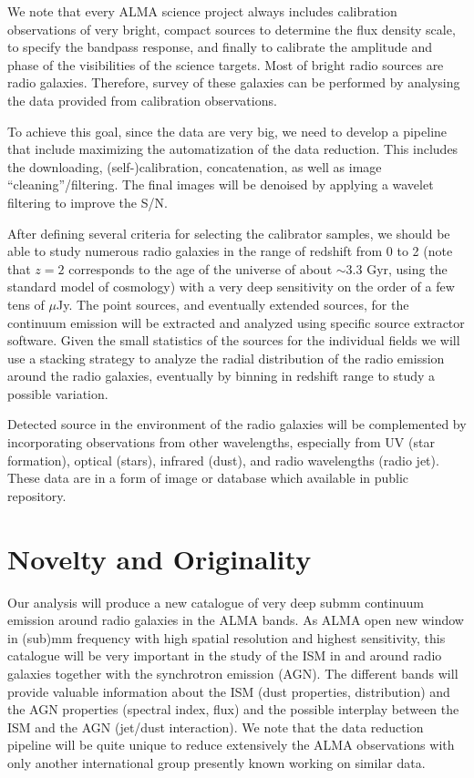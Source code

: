 We note that every ALMA science project always includes calibration observations of very bright, compact sources to determine the flux density scale, to specify the bandpass response, and finally to calibrate the amplitude and phase of the visibilities  of the science targets. Most of bright radio sources are radio galaxies. Therefore, survey of these galaxies can be performed by analysing the data provided from calibration observations.

To achieve this goal, since the data are very big, we need to develop a pipeline that include maximizing the automatization of the data reduction. This includes the downloading, (self-)calibration, concatenation, as well as image ``cleaning''/filtering.  The final images will be denoised by applying a wavelet filtering 
\citep[e.g.,][]{leon2000} to improve the S/N.

After defining several criteria for selecting the calibrator samples, we should be able to study numerous radio galaxies in the range of  redshift from 0 to 2 (note that $z = 2$ corresponds to the age of the universe of about $\sim 3.3$ Gyr, using the standard model of cosmology) with a very deep sensitivity on the order of a few tens of $\mu$Jy. The point sources, and eventually extended sources, for the continuum emission will be extracted and analyzed using specific source extractor software.  Given the small statistics of the sources for the individual fields we will use a stacking strategy to analyze the radial distribution of the radio emission around the radio galaxies, eventually by binning in redshift range to study a possible variation.

Detected source in the environment of the radio galaxies  will be complemented by incorporating observations from other wavelengths, especially from  UV (star formation), optical (stars), infrared (dust), and radio wavelengths (radio jet). These data are in a form of image or database which available in public repository. 

\section{Novelty and Originality}

Our analysis will produce a new catalogue of very deep submm continuum emission around radio galaxies in the ALMA bands. As ALMA open new window in (sub)mm frequency with high spatial resolution and highest sensitivity, this catalogue will be very important in the study of the ISM in  and around radio galaxies together with the synchrotron emission (AGN). The different bands will provide valuable information about the ISM (dust properties, distribution) and the AGN properties (spectral index, flux) and the possible interplay between the ISM and the AGN (jet/dust interaction). We note that the data reduction pipeline will be quite unique to reduce extensively the ALMA observations with only another international group presently known working on similar data.

